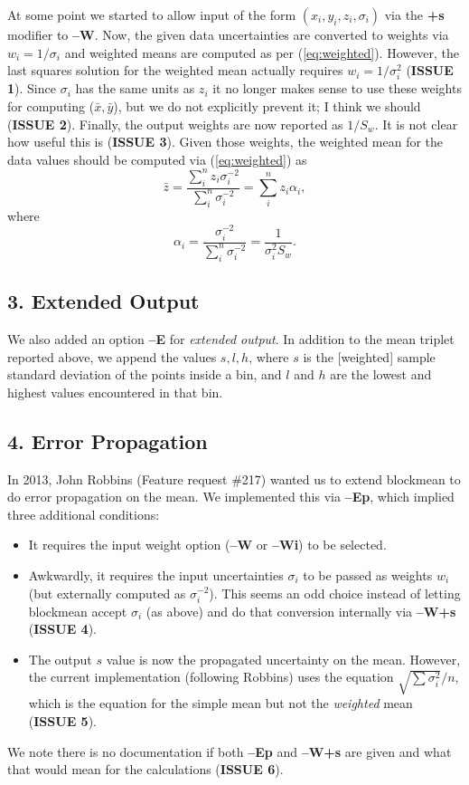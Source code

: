 \documentclass[12pt,letterpaper,margin=0.5in]{report}
\begin{document}
At some point we started to allow input of the form  $(x_i,y_i,z_i,\sigma_i)$ via the {\bf +s} modifier to {\bf--W}. Now,
the given data uncertainties are converted to weights via $w_i = 1/\sigma_i$ and weighted means are computed
as per (\ref{eq:weighted}).  However, the last squares solution for the weighted mean actually requires $w_i = 1/\sigma_i^2$
({\bf ISSUE 1}). Since $\sigma_i$ has the same units as $z_i$ it no longer makes sense to use these weights
for computing ($\bar{x}, \bar{y}$), but we do not explicitly prevent it; I think we should ({\bf ISSUE 2}).
Finally, the output weights are now reported as $1/S_w$.  It is not clear how useful this is ({\bf ISSUE 3}).
Given those weights, the weighted mean for the data values should be computed via (\ref{eq:weighted}) as
\begin{equation}
	\bar{z} = \frac{\sum_i^n z_i \sigma_i^{-2}}{\sum_i^n \sigma_i^{-2}} = \sum_i^n z_i \alpha_i,
	\label{eq:w}
\end{equation}
where
\begin{equation}
	\alpha_i = \frac{ \sigma_i^{-2}}{\sum_i^n \sigma_i^{-2}} = \frac{1}{\sigma_i^2 S_w}.
	\label{eq:a}
\end{equation}


\subsection*{3. Extended Output}

We also added an option {\bf --E} for \emph{extended output}.  In addition to the mean triplet reported above, we append
the values $s, l, h$, where $s$ is the [weighted] sample standard deviation of the points inside a bin, and $l$ and
$h$ are the lowest and highest values encountered in that bin.

\subsection*{4. Error Propagation}

In 2013, John Robbins (Feature request \#217) wanted us to extend blockmean to do error propagation on the mean.  We implemented
this via {\bf --Ep}, which implied three additional conditions:
\begin{itemize}
	\item It requires the input weight option ({\bf --W} or {\bf --Wi}) to be selected.
	\item Awkwardly, it requires the input uncertainties $\sigma_i$ to be passed as weights $w_i$ (but externally computed as $\sigma_i^{-2}$).
		This seems an odd choice instead of letting blockmean accept $\sigma_i$ (as above) and do that conversion internally via {\bf --W+s} ({\bf ISSUE 4}).
	\item The output $s$ value is now the propagated uncertainty on the mean.  However, the current implementation (following Robbins)
		uses the equation $\sqrt{\sum \sigma_i^2}/n$, which is the equation for the simple mean but not the \emph{weighted} mean ({\bf ISSUE 5}).
\end{itemize}
We note there is no documentation if both {\bf --Ep} and {\bf --W+s} are given and what that would mean for the calculations ({\bf ISSUE 6}).
\end{document}
